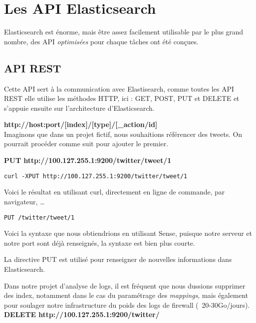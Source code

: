 \section{Les API Elasticsearch}
Elasticsearch est énorme, mais être assez facilement utilisable par le 
plus grand nombre, des \gls{API} \emph{optimisées} pour chaque tâches ont été conçues.

\subsection{API REST}
Cette API sert à la communication avec Elastisearch, comme toutes les API REST elle
utilise les méthodes HTTP, ici : GET, POST, PUT et DELETE et s'appuie ensuite sur l'architecture d'Elasticsearch.

\textbf{{\color{grey}http://host:port}/[{\color{red}index}]/[{\color{cyan}type}]/[{\color{yellow}\_action/id}]}\\[5mm]
Imaginons que dans un projet fictif, nous souhaitions référencer des tweets.
On pourrait procéder comme suit pour ajouter le premier.

\textbf{PUT  {\color{grey} http://100.127.255.1:9200}/{\color{red}twitter}/{\color{cyan}tweet}/{\color{yellow}1}}

\begin{lstlisting}[style=code,label={lst:RESTexemple1curl},caption={Avec curl}]
curl -XPUT http://100.127.255.1:9200/twitter/tweet/1
\end{lstlisting}
Voici le résultat en utilisant curl, directement en ligne de commande, par 
navigateur, \ldots

\begin{lstlisting}[style=code,label={lst:RESTexemple1sense},caption={Avec Sense}]
PUT /twitter/tweet/1
\end{lstlisting}

Voici la syntaxe que nous obtiendrions en utilisant Sense, puisque notre serveur 
et notre port sont déjà renseignés, la syntaxe est bien plus courte.

La directive PUT est utilisé pour renseigner de nouvelles informations dans Elasticsearch.


Dans notre projet d'analyse de logs, il est fréquent que nous dussions supprimer 
des index, notamment dans le cas du paramétrage des \emph{mappings}, mais également
pour soulager notre infrastructure du poids des logs de firewall (~20-30Go/jours).\\

\textbf{DELETE  {\color{grey} http://100.127.255.1:9200}/{\color{red}twitter}/}\\

